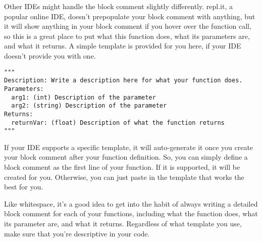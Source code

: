 Other IDEs might handle the block comment slightly differently. repl.it, a popular online IDE, doesn't prepopulate your block comment with anything, but it will show anything in your block comment if you hover over the function call, so this is a great place to put what this function does, what its parameters are, and what it returns. A simple template is provided for you here, if your IDE doesn't provide you with one.\par
\begin{lstlisting}[style=pippython]
"""
Description: Write a description here for what your function does.
Parameters:
  arg1: (int) Description of the parameter
  arg2: (string) Description of the parameter
Returns:
  returnVar: (float) Description of what the function returns
"""
\end{lstlisting}
If your IDE supports a specific template, it will auto-generate it once you create your block comment after your function definition. So, you can simply define a block comment as the first line of your function. If it is supported, it will be created for you. Otherwise, you can just paste in the template that works the best for you.\par
Like whitespace, it's a good idea to get into the habit of always writing a detailed block comment for each of your functions, including what the function does, what its parameter are, and what it returns. Regardless of what template you use, make sure that you're descriptive in your code.\par
